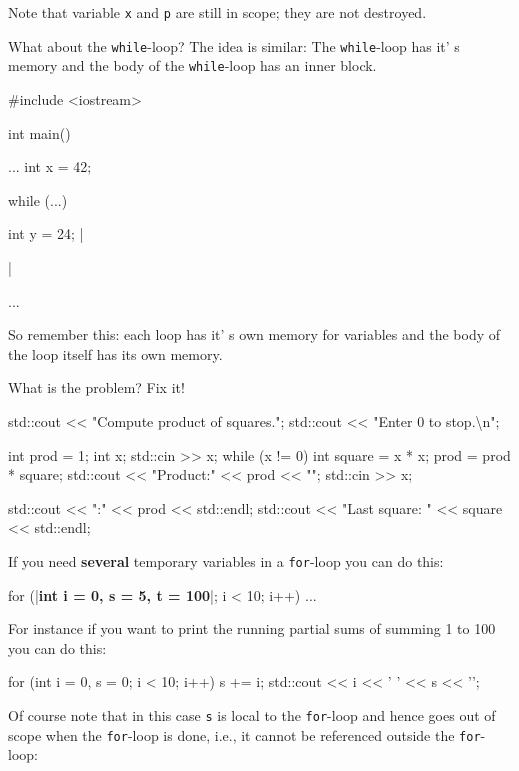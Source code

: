 Note that variable \texttt{x} and \texttt{p} are still in scope; they are not destroyed.

What about the \texttt{while}-loop? The idea is similar: The \texttt{while}-loop has it' s memory and the body of the \texttt{while}-loop has an inner block.

\begin{consolethree}[escapeinside=||]
#include <iostream>

int main()
{    
     ...
     int x = 42;

     while (...)
     {     
           int y = 24;
           ||
     }

     ...
}
\end{consolethree}

So remember this: each loop has it' s own memory for
variables and the body of the loop itself has its own memory.

\begin{ex} What is the problem? Fix it!

\begin{console}
std::cout << "Compute product of squares.";
std::cout << "Enter 0 to stop.\textbackslash n";

int prod = 1;
int x;
std::cin >> x;
while (x != 0)
{     
     int square = x * x;
     prod = prod * square;
     std::cout << "Product:" << prod << "\n";
     std::cin >> x;
}

std::cout << "\nProduct:" << prod << std::endl;
std::cout << "Last square: " << square
          << std::endl;
\end{console}
\end{ex}
If you need \textbf{several} temporary variables in a \texttt{for}-loop
you can do this:

\begin{consolethree}[escapeinside=||]
for (|\textbf{int i = 0, s = 5, t = 100}|; i < 10; i++)
{
    ...
}
\end{consolethree}

For instance if you want to print the running partial sums of summing 1
to 100 you can do this:

\begin{console}
for (int i = 0, s = 0; i < 10; i++)
{   
    s += i;
    std::cout << i << ' ' << s << '\n';
}
\end{console}

Of course note that in this case \texttt{s} is local to the \texttt{for}-loop and hence goes out of scope when the \texttt{for}-loop is done, i.e., it cannot be referenced outside the \texttt{for}-loop:

